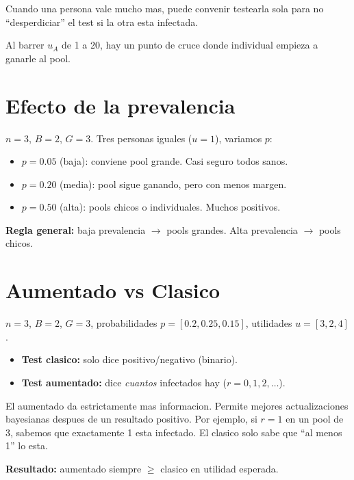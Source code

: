 \documentclass[11pt]{article}
\begin{document}
Cuando una persona vale mucho mas, puede convenir testearla sola
para no ``desperdiciar'' el test si la otra esta infectada.

Al barrer $u_A$ de 1 a 20, hay un punto de cruce donde individual
empieza a ganarle al pool.

\section{Efecto de la prevalencia}

$n=3$, $B=2$, $G=3$. Tres personas iguales ($u=1$), variamos $p$:

\begin{itemize}
  \item $p=0.05$ (baja): conviene pool grande. Casi seguro todos sanos.
  \item $p=0.20$ (media): pool sigue ganando, pero con menos margen.
  \item $p=0.50$ (alta): pools chicos o individuales. Muchos positivos.
\end{itemize}

\textbf{Regla general:} baja prevalencia $\rightarrow$ pools grandes.
Alta prevalencia $\rightarrow$ pools chicos.

\section{Aumentado vs Clasico}

$n=3$, $B=2$, $G=3$, probabilidades $p = [0.2, 0.25, 0.15]$, utilidades $u = [3, 2, 4]$.

\begin{itemize}
  \item \textbf{Test clasico:} solo dice positivo/negativo (binario).
  \item \textbf{Test aumentado:} dice \emph{cuantos} infectados hay ($r = 0, 1, 2, \ldots$).
\end{itemize}

El aumentado da estrictamente mas informacion.
Permite mejores actualizaciones bayesianas despues de un resultado positivo.
Por ejemplo, si $r=1$ en un pool de 3, sabemos que exactamente 1 esta infectado.
El clasico solo sabe que ``al menos 1'' lo esta.

\textbf{Resultado:} aumentado siempre $\geq$ clasico en utilidad esperada.

\end{document}
